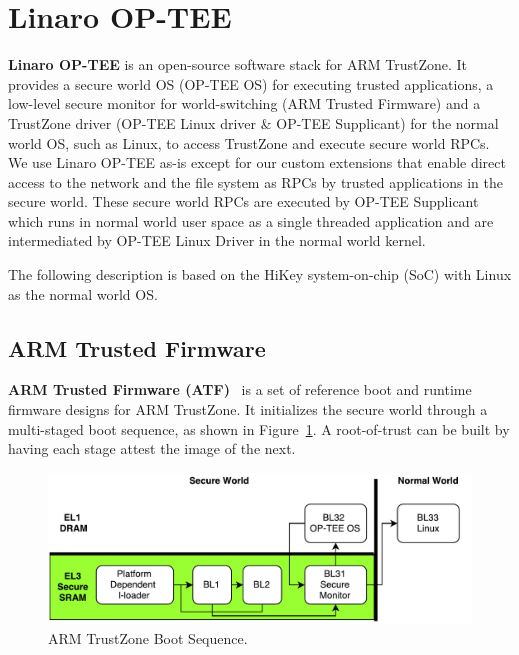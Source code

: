 \section{Linaro OP-TEE}

\textbf{Linaro OP-TEE} is an open-source software stack for ARM
TrustZone. It provides a secure world \ac{OS} (OP-TEE OS) for executing
trusted applications, a low-level secure monitor for world-switching
(ARM Trusted Firmware) and a TrustZone driver (OP-TEE Linux driver \&
OP-TEE Supplicant) for the normal world \ac{OS}, such as Linux, to access
TrustZone and execute secure world RPCs. We use Linaro OP-TEE as-is except 
for our custom extensions that enable direct access to the network and the 
file system as RPCs by trusted applications in the secure world.
These secure world RPCs are executed by OP-TEE Supplicant which runs in 
normal world user space as a single threaded application and are intermediated 
by OP-TEE Linux Driver in the normal world kernel. 


The following description is based on the HiKey system-on-chip (SoC) with Linux as the normal world 
OS. 

\subsection{ARM Trusted Firmware}
\textbf{ARM Trusted Firmware (ATF)}~\cite{atf} is a set of reference boot and runtime firmware designs for 
ARM TrustZone. It initializes the secure world through a multi-staged boot sequence, as shown in
Figure~\ref{fig:bootsequence}. 
A root-of-trust can be built by having each stage attest the image of the 
next. 



\begin{figure}
\centering
\includegraphics[width=\columnwidth]{fig/bootsequence.pdf}  
\caption{ARM TrustZone Boot Sequence.}
\label{fig:bootsequence}
\end{figure}

